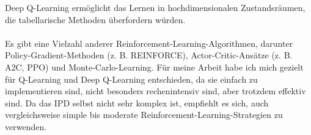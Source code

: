 Deep Q-Learning ermöglicht das Lernen in hochdimensionalen Zustandsräumen, die 
tabellarische Methoden überfordern würden. \\ \\
Es gibt eine Vielzahl anderer Reinforcement-Learning-Algorithmen, darunter Policy-Gradient-Methoden 
(z. B. REINFORCE), Actor-Critic-Ansätze (z. B. A2C, PPO) und Monte-Carlo-Learning. 
Für meine Arbeit habe ich mich gezielt für 
Q-Learning und Deep Q-Learning entschieden, da sie einfach zu implementieren sind, nicht besonders 
rechenintensiv sind, aber trotzdem effektiv sind. Da das IPD selbst nicht sehr komplex ist, 
empfiehlt es sich, auch vergleichsweise simple bis moderate Reinforcement-Learning-Strategien zu verwenden.

